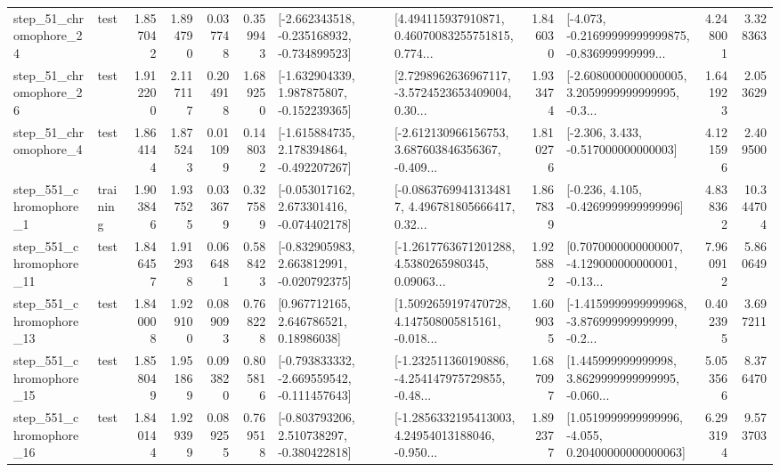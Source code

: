 \begin{tabular}{llrrrrllrlrr}
   step\_51\_chromophore\_24 &      test &      1.857042 &    1.894790 &      0.037748 &  0.359943 &  [-2.662343518, -0.235168932, -0.734899523] &  [4.494115937910871, 0.46070083255751815, 0.774... &       1.846030 &  [-4.073, -0.21699999999999875, -0.836999999999... &            4.248001 &          3.328363 \\
   step\_51\_chromophore\_26 &      test &      1.912200 &    2.117117 &      0.204918 &  1.689250 &   [-1.632904339, 1.987875807, -0.152239365] &  [2.7298962636967117, -3.5724523653409004, 0.30... &       1.933474 &  [-2.6080000000000005, 3.2059999999999995, -0.3... &            1.641923 &          2.053629 \\
    step\_51\_chromophore\_4 &      test &      1.864144 &    1.875243 &      0.011099 &  0.148032 &   [-1.615884735, 2.178394864, -0.492207267] &  [-2.612130966156753, 3.687603846356367, -0.409... &       1.810276 &                [-2.306, 3.433, -0.517000000000003] &            4.121596 &          2.409500 \\
   step\_551\_chromophore\_1 &  training &      1.903846 &    1.937525 &      0.033679 &  0.327589 &   [-0.053017162, 2.673301416, -0.074402178] &  [-0.08637699413134817, 4.496781805666417, 0.32... &       1.867839 &               [-0.236, 4.105, -0.4269999999999996] &            4.838362 &         10.344704 \\
  step\_551\_chromophore\_11 &      test &      1.846457 &    1.912938 &      0.066481 &  0.588423 &   [-0.832905983, 2.663812991, -0.020792375] &  [-1.2617763671201288, 4.5380265980345, 0.09063... &       1.925882 &  [0.7070000000000007, -4.129000000000001, -0.13... &            7.960912 &          5.860649 \\
  step\_551\_chromophore\_13 &      test &      1.840008 &    1.929100 &      0.089093 &  0.768228 &      [0.967712165, 2.646786521, 0.18986038] &  [1.5092659197470728, 4.147508005815161, -0.018... &       1.609035 &  [-1.4159999999999968, -3.876999999999999, -0.2... &            0.402395 &          3.697211 \\
  step\_551\_chromophore\_15 &      test &      1.858049 &    1.951869 &      0.093820 &  0.805816 &  [-0.793833332, -2.669559542, -0.111457643] &  [-1.232511360190886, -4.254147975729855, -0.48... &       1.687097 &  [1.445999999999998, 3.8629999999999995, -0.060... &            5.053566 &          8.376470 \\
  step\_551\_chromophore\_16 &      test &      1.840144 &    1.929399 &      0.089255 &  0.769518 &   [-0.803793206, 2.510738297, -0.380422818] &  [-1.2856332195413003, 4.24954013188046, -0.950... &       1.892377 &  [1.0519999999999996, -4.055, 0.20400000000000063] &            6.293194 &          9.573703 \\

\end{tabular}

